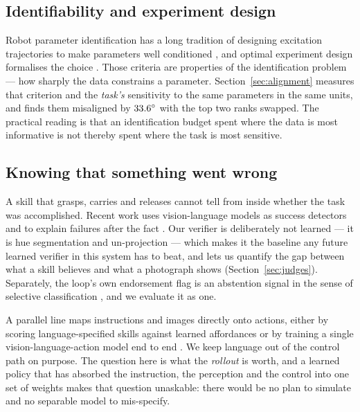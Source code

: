 \documentclass[11pt,a4paper]{article}
\begin{document}
\subsection{Identifiability and experiment design}
Robot parameter identification has a long tradition of designing excitation
trajectories to make parameters well conditioned
\citep{gautier1992exciting,swevers2007dynamic}, and optimal experiment design
formalises the choice \citep{pukelsheim1993optimal}. Those criteria are
properties of the identification problem --- how sharply the data constrains a
parameter. Section~\ref{sec:alignment} measures that criterion and the
\emph{task's} sensitivity to the same parameters in the same units, and finds
them misaligned by $33.6^\circ$ with the top two ranks swapped. The
practical reading is that an identification budget spent where the data is most
informative is not thereby spent where the task is most sensitive.

\subsection{Knowing that something went wrong}
A skill that grasps, carries and releases cannot tell from inside whether the
task was accomplished. Recent work uses vision-language models as success
detectors \citep{du2023vision} and to explain failures after the fact
\citep{liu2023reflect}. Our verifier is deliberately not learned --- it is hue
segmentation and un-projection \citep{hartley2003multiple} --- which makes it the
baseline any future learned verifier in this system has to beat, and lets us
quantify the gap between what a skill believes and what a photograph shows
(Section~\ref{sec:judges}). Separately, the loop's own endorsement flag is an
abstention signal in the sense of selective classification
\citep{elyaniv2010foundations,geifman2017selective}, and we evaluate it as one.

A parallel line maps instructions and images directly onto actions, either by
scoring language-specified skills against learned affordances
\citep{ahn2022saycan} or by training a single vision-language-action model
end to end \citep{driess2023palme,brohan2023rt2,kim2024openvla}. We keep
language out of the control path on purpose. The question here is what the
\emph{rollout} is worth, and a learned policy that has absorbed the instruction,
the perception and the control into one set of weights makes that question
unaskable: there would be no plan to simulate and no separable model to
mis-specify.
\end{document}

